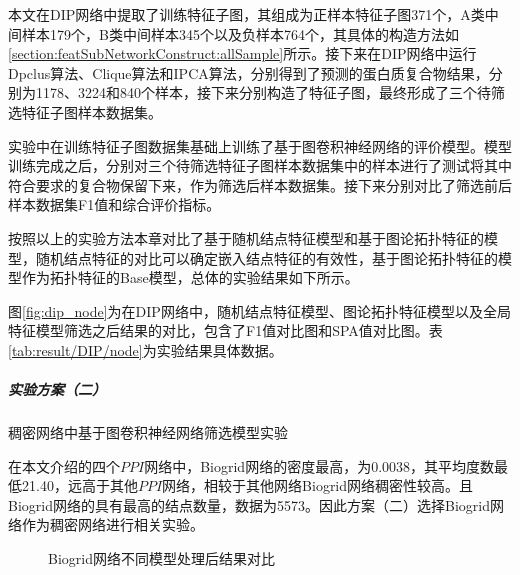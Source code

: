 本文在DIP网络中提取了训练特征子图，其组成为正样本特征子图371个，A类中间样本179个，B类中间样本345个以及负样本764个，其具体的构造方法如\ref{section:featSubNetworkConstruct:allSample}所示。接下来在DIP网络中运行Dpclus算法、Clique算法和IPCA算法，分别得到了预测的蛋白质复合物结果，分别为1178、3224和840个样本，接下来分别构造了特征子图，最终形成了三个待筛选特征子图样本数据集。

实验中在训练特征子图数据集基础上训练了基于图卷积神经网络的评价模型。模型训练完成之后，分别对三个待筛选特征子图样本数据集中的样本进行了测试将其中符合要求的复合物保留下来，作为筛选后样本数据集。接下来分别对比了筛选前后样本数据集F1值和综合评价指标。

按照以上的实验方法本章对比了基于随机结点特征模型和基于图论拓扑特征的模型，随机结点特征的对比可以确定嵌入结点特征的有效性，基于图论拓扑特征的模型作为拓扑特征的Base模型，总体的实验结果如下所示。



图\ref{fig:dip_node}为在DIP网络中，随机结点特征模型、图论拓扑特征模型以及全局特征模型筛选之后结果的对比，包含了F1值对比图和SPA值对比图。表\ref{tab:result/DIP/node}为实验结果具体数据。

\subparagraph*{实验方案（二）} 稠密网络中基于图卷积神经网络筛选模型实验

在本文介绍的四个$PPI$网络中，Biogrid网络的密度最高，为0.0038，其平均度数最低21.40，远高于其他$PPI$网络，相较于其他网络Biogrid网络稠密性较高。且Biogrid网络的具有最高的结点数量，数据为5573。因此方案（二）选择Biogrid网络作为稠密网络进行相关实验。

\begin{figure}[htbp]
    \centering
    \vskip0.2cm
    \caption{Biogrid网络不同模型处理后结果对比}
    \label{fig:biogrid_node}
\end{figure}

